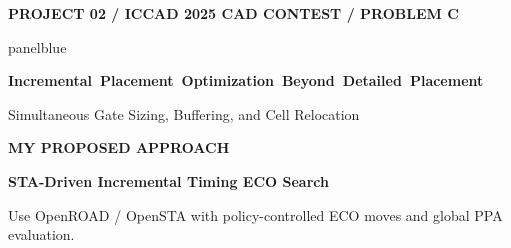 \documentclass[aspectratio=169,10pt]{beamer}
\newcommand{\smalllabel}[1]{{\scriptsize\bfseries\color{Accent}\MakeUppercase{#1}}}
\begin{document}
{
\begin{frame}[plain]
  \vfill
  \smalllabel{Project 02 / ICCAD 2025 CAD Contest / Problem C}\par
  \vspace{.40cm}
  \begin{beamercolorbox}[rounded=true,sep=.25cm,wd=\linewidth]{panelblue}
    {\fontsize{13.6}{17}\selectfont\bfseries\color{Ink}
    \mbox{Incremental Placement Optimization Beyond Detailed Placement}\par}
    \vspace{.14cm}
    {\normalsize\color{Ink}
      Simultaneous Gate Sizing, Buffering, and Cell Relocation\par}
  \end{beamercolorbox}
  \vspace{.80cm}
  \smalllabel{My Proposed Approach}\par
  \vspace{.17cm}
  {\fontsize{18}{23}\selectfont\bfseries\color{Accent}
    STA-Driven Incremental Timing ECO Search\par}
  \vspace{.18cm}
  {\small\color{Muted}
    Use OpenROAD / OpenSTA with policy-controlled ECO moves and global PPA evaluation.\par}
  \vfill
\end{frame}}
\end{document}
